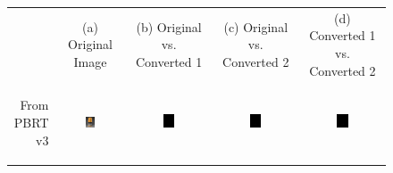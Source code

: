 \begin{figure}[t!bp]
	\centering
	\begin{tabular}{@{}r@{ } c@{ } c@{ } c@{ } c }
		&
		\small{(a) Original Image} &
		\small{(b) Original vs. Converted 1} &
		\small{(c) Original vs. Converted 2} &
		\small{(d) Converted 1 vs. Converted 2} \\
	
		\begin{sideways} \parbox[b]{30mm} {\small{From\\ PBRT v3}} \end{sideways} &
		\includegraphics[width=0.15\textwidth]{figs/4_results/coffee/1_from_pbrt.png} &
		\includegraphics[width=0.15\textwidth]{figs/4_results/coffee/diff_pbrt-mitsuba.png} &
		\includegraphics[width=0.15\textwidth]{figs/4_results/coffee/diff_pbrt-lux.png} &
		\includegraphics[width=0.15\textwidth]{figs/4_results/coffee/diff_mitsuba-lux.png} \\
		

\end{tabular}
\end{figure}

